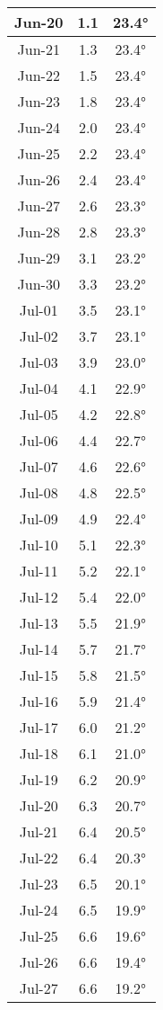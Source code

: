 \begin{footnotesize}
\begin{minipage}{0.33\textwidth}
\begin{tabular}[t]{c | c | c}
Jun-20 & 1.1 & 23.4°\\\hline
Jun-21 & 1.3 & 23.4°\\\hline
Jun-22 & 1.5 & 23.4°\\\hline
Jun-23 & 1.8 & 23.4°\\\hline
Jun-24 & 2.0 & 23.4°\\\hline
Jun-25 & 2.2 & 23.4°\\\hline
Jun-26 & 2.4 & 23.4°\\\hline
Jun-27 & 2.6 & 23.3°\\\hline
Jun-28 & 2.8 & 23.3°\\\hline
Jun-29 & 3.1 & 23.2°\\\hline
Jun-30 & 3.3 & 23.2°\\\hline
Jul-01 & 3.5 & 23.1°\\\hline
Jul-02 & 3.7 & 23.1°\\\hline
Jul-03 & 3.9 & 23.0°\\\hline
Jul-04 & 4.1 & 22.9°\\\hline
Jul-05 & 4.2 & 22.8°\\\hline
Jul-06 & 4.4 & 22.7°\\\hline
Jul-07 & 4.6 & 22.6°\\\hline
Jul-08 & 4.8 & 22.5°\\\hline
Jul-09 & 4.9 & 22.4°\\\hline
Jul-10 & 5.1 & 22.3°\\\hline
Jul-11 & 5.2 & 22.1°\\\hline
Jul-12 & 5.4 & 22.0°\\\hline
Jul-13 & 5.5 & 21.9°\\\hline
Jul-14 & 5.7 & 21.7°\\\hline
Jul-15 & 5.8 & 21.5°\\\hline
Jul-16 & 5.9 & 21.4°\\\hline
Jul-17 & 6.0 & 21.2°\\\hline
Jul-18 & 6.1 & 21.0°\\\hline
Jul-19 & 6.2 & 20.9°\\\hline
Jul-20 & 6.3 & 20.7°\\\hline
Jul-21 & 6.4 & 20.5°\\\hline
Jul-22 & 6.4 & 20.3°\\\hline
Jul-23 & 6.5 & 20.1°\\\hline
Jul-24 & 6.5 & 19.9°\\\hline
Jul-25 & 6.6 & 19.6°\\\hline
Jul-26 & 6.6 & 19.4°\\\hline
Jul-27 & 6.6 & 19.2°\\\hline

\end{tabular}
\end{minipage}
\end{footnotesize}
